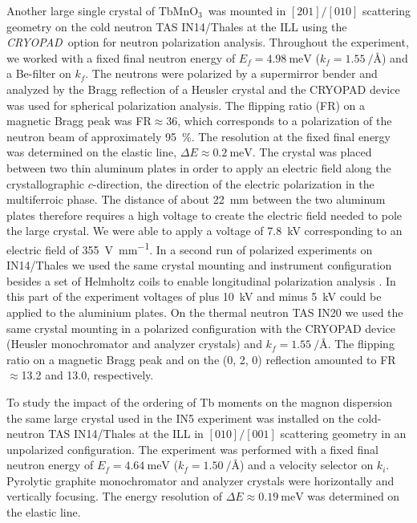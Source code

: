 \documentclass[aps,prb,twocolumn,superscriptaddress,showpacs,floatfix]{revtex4-2}
\newcommand{\tbmno}{TbMnO$_3$}
\newcommand{\cryopad}{\textit{CRYOPAD}}
\begin{document}
Another large single crystal of \tbmno\ was mounted in $[201]/[010]$ scattering geometry on the cold neutron TAS IN14/Thales at the ILL using the \cryopad\ option for neutron polarization analysis. Throughout the experiment, we worked with a fixed final neutron energy of $E_f=\SI{4.98}{\milli\eV}$ ($k_f=\SI{1.55}{\per\angstrom}$) and a Be-filter on $k_f$. The neutrons were polarized by a supermirror bender and analyzed by the Bragg reflection of a Heusler crystal and the CRYOPAD device was used for spherical polarization analysis. The flipping ratio (FR) on a magnetic Bragg peak was FR$\approx$36, which corresponds to a polarization of the neutron beam of approximately \SI{95}{\percent}. The resolution at the fixed final energy was determined on the elastic line, $\Delta E\approx\SI{0.2}{\meV}$. The crystal was placed between two thin aluminum plates in order to apply an electric field along the crystallographic $c$-direction, the direction of the electric polarization in the multiferroic phase. The distance of about \SI{22}{\mm} between the two aluminum plates therefore requires a high voltage to create the electric field needed to pole the large crystal. We were able to apply a voltage of \SI{7.8}{\kilo\volt} corresponding to an electric field of \SI{355}{\volt\per\mm}. In a second run of polarized experiments on IN14/Thales we used the same crystal mounting and instrument configuration besides a set of Helmholtz coils to enable longitudinal polarization analysis \cite{data-4-03-1730}.
In this part of the experiment voltages of plus \SI{10}{\kilo\volt} and minus \SI{5}{\kilo\volt} could be applied to the aluminium plates.
On the thermal neutron TAS IN20 we used the same crystal mounting in a polarized configuration with the CRYOPAD device (Heusler monochromator and analyzer crystals) and $k_f=\SI{1.55}{\per\angstrom}$.
The flipping ratio on a magnetic Bragg peak and on the (0, 2, 0) reflection amounted to  FR$\approx$13.2 and 13.0, respectively.

To study the impact of the ordering of Tb moments on the magnon dispersion the same large crystal used in the IN5 experiment was installed on the cold-neutron TAS IN14/Thales at the ILL in $[010]/[001]$ scattering geometry in an unpolarized configuration. The experiment was performed with a fixed final neutron energy of $E_f=\SI{4.64}{\milli\eV}$ ($k_f=\SI{1.50}{\per\angstrom}$) and a velocity selector on $k_i$. Pyrolytic graphite monochromator and analyzer crystals  were horizontally and vertically focusing. The energy resolution of $\Delta E\approx\SI{0.19}{\meV}$ was determined on the elastic line.
\end{document}
